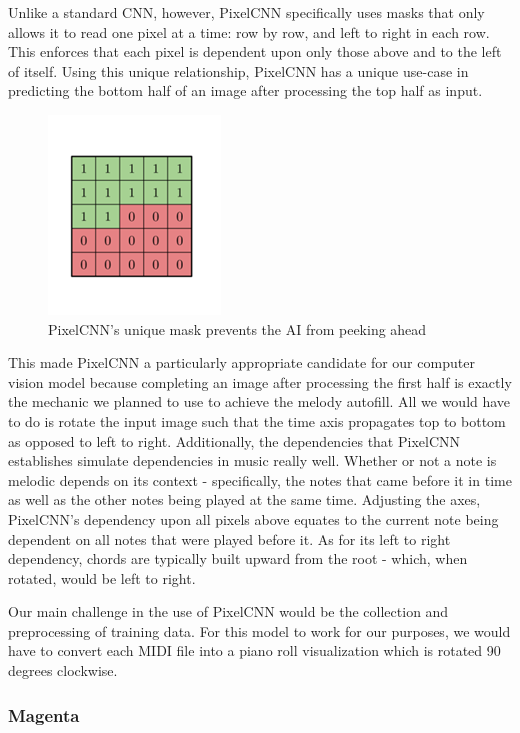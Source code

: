 Unlike a standard CNN, however, PixelCNN specifically uses masks that only allows it to
read one pixel at a time: row by row, and left to right in each row. This enforces that
each pixel is dependent upon only those above and to the left of itself. Using this unique
relationship, PixelCNN has a unique use-case in predicting the bottom half of an image
after processing the top half as input.

\begin{figure}[h!]
  \centering
  \includegraphics{image/PixelMask.png}
  \caption{PixelCNN's unique mask prevents the AI from peeking ahead}
  \label{fig:pixel_mask}
\end{figure}

This made PixelCNN a particularly appropriate candidate for our computer vision model
because completing an image after processing the first half is exactly the mechanic we
planned to use to achieve the melody autofill. All we would have to do is rotate the input
image such that the time axis propagates top to bottom as opposed to left to right.
Additionally, the dependencies that PixelCNN establishes simulate dependencies in music
really well. Whether or not a note is melodic depends on its context - specifically, the
notes that came before it in time as well as the other notes being played at the same
time. Adjusting the axes, PixelCNN's dependency upon all pixels above equates to the
current note being dependent on all notes that were played before it. As for its left to
right dependency, chords are typically built upward from the root - which, when rotated,
would be left to right.

Our main challenge in the use of PixelCNN would be the collection and preprocessing of
training data. For this model to work for our purposes, we would have to convert each MIDI
file into a piano roll visualization which is rotated 90 degrees clockwise.

\subsubsection{Magenta}

